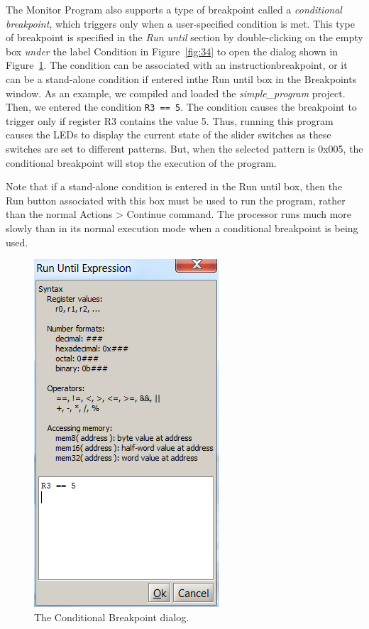 \documentclass[11pt, twoside, pdftex]{article}
\begin{document}
The Monitor Program also supports a type of breakpoint called a
{\it conditional breakpoint}, which triggers only when a 
user-specified condition is met. This type of breakpoint is
specified in the {\it Run until} section by double-clicking on the 
empty box {\it under} the label {\sf Condition} in Figure~\ref{fig:34} 
to open the dialog shown in Figure~\ref{fig:35}. The condition can be 
associated with an instructionbreakpoint, or it can be a stand-alone condition 
if entered inthe {\sf Run until} box in the Breakpoints window. 
As an example, we compiled and loaded the {\it simple\_program}
project. Then, we entered the condition \texttt{R3 == 5}. The
condition causes the breakpoint to trigger only if register
R3 contains the value 5. Thus, running this program causes the 
LEDs to display the current state of the slider switches as these
switches are set to different patterns. But, when the selected
pattern is 0x005, the conditional breakpoint will stop the
execution of the program.


Note that if a stand-alone condition is entered in the
{\sf Run until} box, then the Run button associated with this box must be used to run the
program, rather than the normal {\sf Actions > Continue} command.  
The processor runs much more slowly than in its
normal execution mode when a conditional breakpoint is being used.

\begin{figure}[H]
   \begin{center}
      \includegraphics[scale=1]{screenshots/figure35.png}
   \end{center}
   \caption{The Conditional Breakpoint dialog.} 
	 \label{fig:35}
\end{figure}
\end{document}
